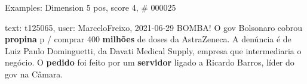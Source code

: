 \begin{frame}{Examples: Dimension 5 pos, score 4, \# 000025}
\footnotesize
\begin{exampleblock}{text: t125065, user: MarceloFreixo, 2021-06-29}
BOMBA! O gov Bolsonaro cobrou \textbf{propina} p / comprar 400 \textbf{milhões} 
de doses da AstraZeneca. A denúncia é de Luiz Paulo Dominguetti, da Davati 
Medical Supply, empresa que intermediaria o negócio. O \textbf{pedido} foi 
feito por um \textbf{servidor} ligado a Ricardo Barros, líder do gov na Câmara. 
\end{exampleblock}
\end{frame}
